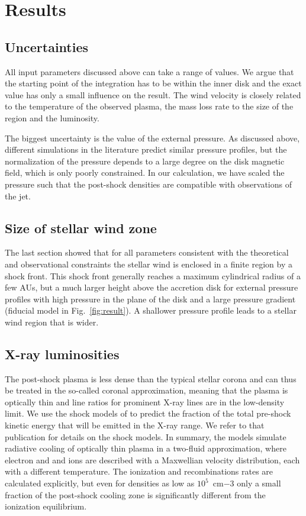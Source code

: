 \section{Results}
\label{sect:results}

\subsection{Uncertainties}
All input parameters discussed above can take a range of values. We argue that the starting point of the integration has to be within the inner disk and the exact value has only a small influence on the result. The wind velocity is closely related to the temperature of the observed plasma, the mass loss rate to the size of the region and the luminosity.

The biggest uncertainty is the value of the external pressure. As discussed above, different simulations in the literature predict similar pressure profiles, but the normalization of the pressure depends to a large degree on the disk magnetic field, which is only poorly constrained. In our calculation, we have scaled the pressure such that the post-shock densities are compatible with observations of the jet.


\subsection{Size of stellar wind zone}
The last section showed that for all parameters consistent with the theoretical and observational constraints the stellar wind is enclosed in a finite region by a shock front. This shock front generally reaches a maximum cylindrical radius of a few AUs, but a much larger height above the accretion disk for external pressure profiles with high pressure in the plane of the disk and a large pressure gradient (fiducial model in Fig.~\ref{fig:result}). A shallower pressure profile leads to a stellar wind region that is wider. 

\subsection{X-ray luminosities}
\label{sect:LX}
The post-shock plasma is less dense than the typical stellar corona and can thus be treated in the so-called coronal approximation, meaning that the plasma is optically thin and line ratios for prominent X-ray lines are in the low-density limit. We use the shock models of \citet{2007A&A...466.1111G} to predict the fraction of the total pre-shock kinetic energy that will be emitted in the X-ray range. We refer to that publication for details on the shock models. In summary, the models simulate radiative cooling of optically thin plasma in a two-fluid approximation, where electron and and ions are described with a Maxwellian velocity distribution, each with a different temperature. The ionization and recombinations rates are calculated explicitly, but even for densities as low as $10^5$~cm${-3}$ only a small fraction of the post-shock cooling zone is significantly different from the ionization equilibrium.

